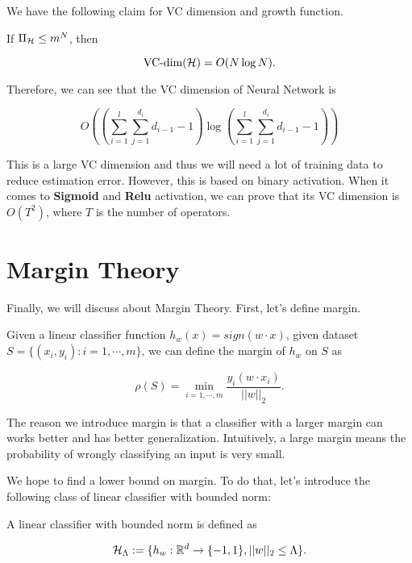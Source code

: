 \documentclass[../main.tex]{subfiles}
\begin{document}
	
	We have the following claim for VC dimension and growth function.
	
	\begin{claim}
		If $\Pi_{\mathcal{H}} \leq m^N$, then
		
		\begin{equation}
			\textmd{VC-dim}(\mathcal{H}) = O(N\log N).
		\end{equation}
	\end{claim}

	Therefore, we can see that the VC dimension of Neural Network is 
	
	\begin{equation*}
		O((\sum\limits_{i=1}^l \sum\limits_{j=1}^{d_i}d_{i-1} - 1)\log (\sum\limits_{i=1}^l \sum\limits_{j=1}^{d_i}d_{i-1} - 1))
	\end{equation*}

	This is a large VC dimension and thus we will need a lot of training data to reduce estimation error. However, this is based on binary activation. When it comes to \textbf{Sigmoid} and \textbf{Relu} activation, we can prove that its VC dimension is $O(T^2)$, where $T$ is the number of operators.
	
	\section{Margin Theory}
	
	Finally, we  will discuss about Margin Theory. First, let's define margin.
	
	\begin{definition}
		Given a linear classifier function $h_{w}(x) = sign(w \cdot x)$, given dataset $S = \{(x_i,y_i):i=1,\cdots, m \}$, we can define the margin of $h_w$ on $S$ as
		
		\begin{equation}
			\rho(S) = \min\limits_{i=1,\cdots,m} \frac{y_i(w\cdot x_i)}{||w||_2}.
		\end{equation}
	\end{definition}
	
	The reason we introduce margin is that a classifier with a larger margin can works better and has better generalization. Intuitively, a large margin means the probability of wrongly classifying an input is very small.
	
	We hope to find a lower bound on margin. To do that, let's introduce the following class of linear classifier with bounded norm:
	
	\begin{definition}
		A linear classifier with bounded norm is defined as 
		
		\begin{equation}
			\mathcal{H}_{\Lambda} := \{h_w:\mathbb{R}^d \to \{-1,1\}, ||w||_2 \leq \Lambda \}.
		\end{equation}
	\end{definition}
\end{document}
